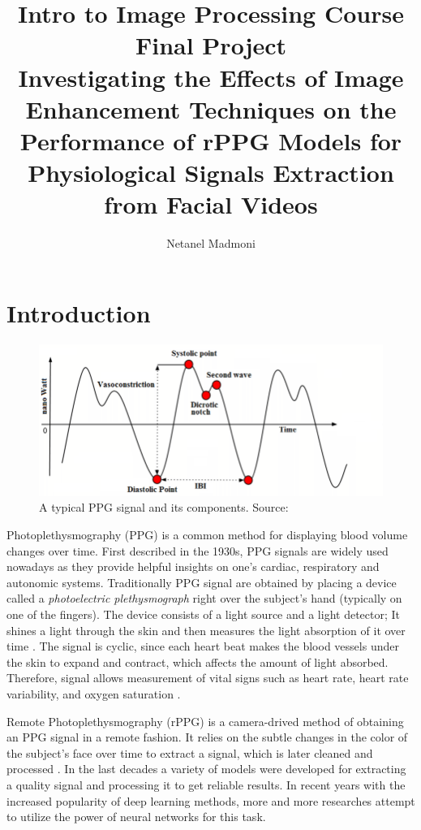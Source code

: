 \documentclass{article}
\author{Netanel Madmoni}
\title{Intro to Image Processing Course Final Project \\
\large Investigating the Effects of Image Enhancement Techniques 
on the Performance of rPPG Models for
Physiological Signals Extraction from Facial Videos}
\begin{document}
\maketitle

\section*{Introduction}

\begin{figure}
	\includegraphics[scale=0.25]{figures/A-typical-PPG-signal-and-its-components.png}
	\caption{A typical PPG signal and its components. Source: \cite{nathPhotoplethysmogramBasedNonInvasive2018}}
\end{figure}

Photoplethysmography (PPG) is a common method for displaying blood volume changes over time. First described in the 1930s, PPG signals are widely used nowadays as they provide helpful insights on one's cardiac, respiratory and autonomic systems. Traditionally PPG signal are obtained by placing a device called a \textit{photoelectric plethysmograph} right over the subject's hand (typically on one of the fingers). The device consists of a light source and a light detector; It shines a light through the skin and then measures the light absorption of it over time \cite{alianPhotoplethysmography2014}. The signal is cyclic, since each heart beat makes the blood vessels under the skin to expand and contract, which affects the amount of light absorbed. Therefore, signal allows measurement of vital signs such as heart rate, heart rate variability, and oxygen saturation \cite{pirzadaRemotePhotoplethysmographyRPPG2023}.

Remote Photoplethysmography (rPPG) is a camera-drived method of obtaining an PPG signal in a remote fashion. It relies on the subtle changes in the color of the subject's face over time to extract a signal, which is later cleaned and processed \cite{pirzadaRemotePhotoplethysmographyRPPG2023}. In the last decades a variety of models were developed for extracting a quality signal and processing it to get reliable results. In recent years with the increased popularity of deep learning methods, more and more researches attempt to utilize the power of neural networks for this task.
\end{document}
